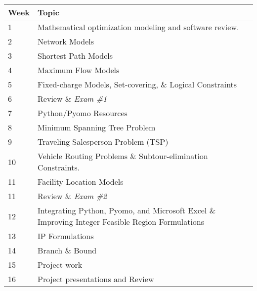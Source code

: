 \documentclass[12pt]{article}
\theoremstyle{definition}
\begin{document}
\renewcommand\arraystretch{1.5}
\begin{longtable}{ll}
Week \hspace{.2in} & Topic \\
\hline 
1 & Mathematical optimization modeling and software review.  \\
2 & Network Models\\
3 & Shortest Path Models\\ 
4 & Maximum Flow Models\\
5 &  Fixed-charge Models, Set-covering, \& Logical Constraints \\
6 & Review \& \textit{Exam \#1} \\
7 & Python/Pyomo Resources\\
8 & Minimum Spanning Tree Problem \\
9 & Traveling Salesperson Problem (TSP) \\
10 & Vehicle Routing Problems \& Subtour-elimination Constraints. \\
11 & Facility Location Models \\
11 & Review \& \textit{Exam \#2}  \\
12 & Integrating Python, Pyomo, and Microsoft Excel \& Improving Integer Feasible Region Formulations \\
13 & IP Formulations\\
14 & Branch \& Bound \\
15 & Project work\\
16 & Project presentations and Review \\
\end{longtable}
\end{document}
